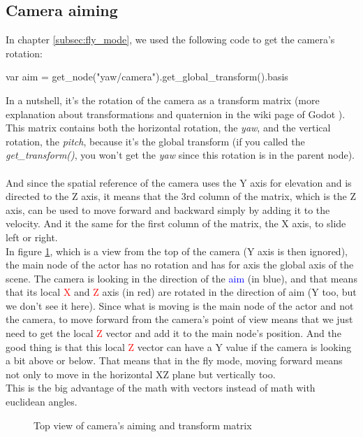 \documentclass[10pt,a4paper]{article}
\begin{document}
\subsection{Camera aiming}
\label{subsec:camera_aiming}
In chapter \ref{subsec:fly_mode}, we used the following code to get the camera's rotation:
\begin{pythoncode}
  var aim = get_node("yaw/camera").get_global_transform().basis
\end{pythoncode}
In a nutshell, it's the rotation of the camera as a transform matrix (more explanation about transformations and quaternion in the wiki page of Godot \cite{wiki_godot}). This matrix contains both the horizontal rotation, the \textit{yaw}, and the vertical rotation, the \textit{pitch}, because it's the global transform (if you called the \textit{get\_transform()}, you won't get the \textit{yaw} since this rotation is in the parent node).\\
\\
And since the spatial reference of the camera uses the Y axis for elevation and is directed to the Z axis, it means that the 3rd column of the matrix, which is the Z axis, can be used to move forward and backward simply by adding it to the velocity. And it the same for the first column of the matrix, the X axis, to slide left or right.\\
In figure \ref{fig:camera_aiming}, which is a view from the top of the camera (Y axis is then ignored), the main node of the actor has no rotation and has for axis the global axis of the scene. The camera is looking in the direction of the \textcolor{blue}{aim} (in blue), and that means that its local \textcolor{red}{X} and \textcolor{red}{Z} axis (in red) are rotated in the direction of aim (Y too, but we don't see it here). Since what is moving is the main node of the actor and not the camera, to move forward from the camera's point of view means that we just need to get the local \textcolor{red}{Z} vector and add it to the main node's position. And the good thing is that this local \textcolor{red}{Z} vector can have a Y value if the camera is looking a bit above or below. That means that in the fly mode, moving forward means not only to move in the horizontal XZ plane but vertically too. \\
This is the big advantage of the math with vectors instead of math with euclidean angles.

\begin{figure}[ht]
\centering
{}
\caption{Top view of camera's aiming and transform matrix}
\label{fig:camera_aiming}
\end{figure}
\end{document}

